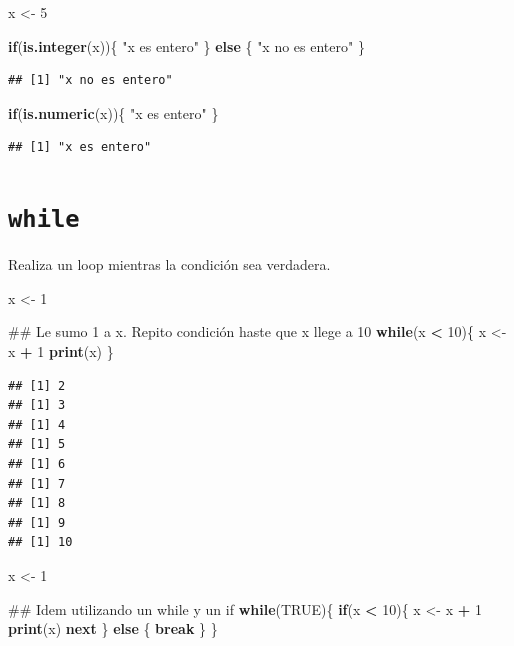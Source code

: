 \documentclass[spanish,]{book}
\newenvironment{Shaded}{\begin{snugshade}}{\end{snugshade}}
\newcommand{\KeywordTok}[1]{\textcolor[rgb]{0.13,0.29,0.53}{\textbf{#1}}}
\newcommand{\DecValTok}[1]{\textcolor[rgb]{0.00,0.00,0.81}{#1}}
\newcommand{\StringTok}[1]{\textcolor[rgb]{0.31,0.60,0.02}{#1}}
\newcommand{\OtherTok}[1]{\textcolor[rgb]{0.56,0.35,0.01}{#1}}
\newcommand{\ControlFlowTok}[1]{\textcolor[rgb]{0.13,0.29,0.53}{\textbf{#1}}}
\newcommand{\OperatorTok}[1]{\textcolor[rgb]{0.81,0.36,0.00}{\textbf{#1}}}
\newcommand{\NormalTok}[1]{#1}
\begin{document}
\begin{Shaded}
\begin{Highlighting}[]
\NormalTok{x <-}\StringTok{ }\DecValTok{5}

\ControlFlowTok{if}\NormalTok{(}\KeywordTok{is.integer}\NormalTok{(x))\{}
  \StringTok{"x es entero"}
\NormalTok{\} }\ControlFlowTok{else}\NormalTok{ \{}
  \StringTok{"x no es entero"}
\NormalTok{\}}
\end{Highlighting}
\end{Shaded}

\begin{verbatim}
## [1] "x no es entero"
\end{verbatim}

\begin{Shaded}
\begin{Highlighting}[]
\ControlFlowTok{if}\NormalTok{(}\KeywordTok{is.numeric}\NormalTok{(x))\{}
  \StringTok{"x es entero"}
\NormalTok{\}}
\end{Highlighting}
\end{Shaded}

\begin{verbatim}
## [1] "x es entero"
\end{verbatim}

\section{\texorpdfstring{\texttt{while}}{while}}\label{while}

Realiza un loop mientras la condición sea verdadera.

\begin{Shaded}
\begin{Highlighting}[]
\NormalTok{x <-}\StringTok{ }\DecValTok{1}

\NormalTok{## Le sumo 1 a x. Repito condición haste que x llege a 10}
\ControlFlowTok{while}\NormalTok{(x }\OperatorTok{<}\StringTok{ }\DecValTok{10}\NormalTok{)\{}
\NormalTok{  x <-}\StringTok{ }\NormalTok{x }\OperatorTok{+}\StringTok{ }\DecValTok{1}
  \KeywordTok{print}\NormalTok{(x)}
\NormalTok{\}}
\end{Highlighting}
\end{Shaded}

\begin{verbatim}
## [1] 2
## [1] 3
## [1] 4
## [1] 5
## [1] 6
## [1] 7
## [1] 8
## [1] 9
## [1] 10
\end{verbatim}

\begin{Shaded}
\begin{Highlighting}[]
\NormalTok{x <-}\StringTok{ }\DecValTok{1}


\NormalTok{## Idem utilizando un while y un if}
\ControlFlowTok{while}\NormalTok{(}\OtherTok{TRUE}\NormalTok{)\{}
  \ControlFlowTok{if}\NormalTok{(x }\OperatorTok{<}\StringTok{ }\DecValTok{10}\NormalTok{)\{}
\NormalTok{    x <-}\StringTok{ }\NormalTok{x }\OperatorTok{+}\StringTok{ }\DecValTok{1}
    \KeywordTok{print}\NormalTok{(x)}
    \ControlFlowTok{next}
\NormalTok{  \} }\ControlFlowTok{else}\NormalTok{ \{}
    \ControlFlowTok{break}
\NormalTok{  \}}
\NormalTok{\}}
\end{Highlighting}
\end{Shaded}
\end{document}
